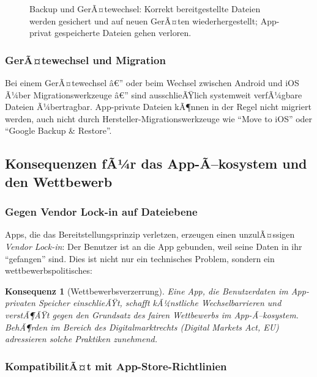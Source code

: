 ﻿\documentclass[12pt, a4paper]{article}
\newtheorem{konsequenz}[definition]{Konsequenz}
\begin{document}
\begin{figure}[ht]
\caption{Backup und GerÃ¤tewechsel: Korrekt bereitgestellte Dateien werden gesichert und
auf neuen GerÃ¤ten wiederhergestellt; App-privat gespeicherte Dateien gehen verloren.}
\label{fig:backup}
\end{figure}

\subsubsection{GerÃ¤tewechsel und Migration}

Bei einem GerÃ¤tewechsel â€” oder beim Wechsel zwischen Android und iOS Ã¼ber
Migrationswerkzeuge â€” sind ausschlieÃŸlich systemweit verfÃ¼gbare Dateien Ã¼bertragbar.
App-private Dateien kÃ¶nnen in der Regel nicht migriert werden, auch nicht durch
Hersteller-Migrationswerkzeuge wie \enquote{Move to iOS} oder \enquote{Google
Backup \& Restore}.

\subsection{Konsequenzen fÃ¼r das App-Ã–kosystem und den Wettbewerb}

\subsubsection{Gegen Vendor Lock-in auf Dateiebene}

Apps, die das Bereitstellungsprinzip verletzen, erzeugen einen unzulÃ¤ssigen
\emph{Vendor Lock-in}: Der Benutzer ist an die App gebunden, weil seine Daten
in ihr \enquote{gefangen} sind. Dies ist nicht nur ein technisches Problem,
sondern ein wettbewerbspolitisches:

\begin{konsequenz}[Wettbewerbsverzerrung]
Eine App, die Benutzerdaten im App-privaten Speicher einschlieÃŸt, schafft
kÃ¼nstliche Wechselbarrieren und verstÃ¶ÃŸt gegen den Grundsatz des fairen
Wettbewerbs im App-Ã–kosystem. BehÃ¶rden im Bereich des Digitalmarktrechts
(Digital Markets Act, EU) adressieren solche Praktiken zunehmend.
\end{konsequenz}

\subsubsection{KompatibilitÃ¤t mit App-Store-Richtlinien}
\end{document}
